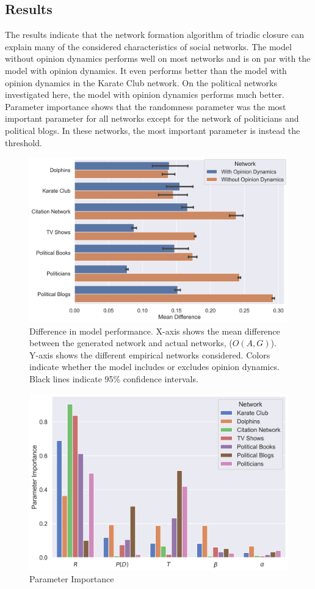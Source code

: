 \documentclass{article}
\begin{document}
\subsection{Results}

The results indicate that the network formation algorithm of triadic closure can explain many of the considered characteristics of social networks. The model without opinion dynamics performs well on most networks and is on par with the model with opinion dynamics. It even performs better than the model with opinion dynamics in the Karate Club network. On the political networks investigated here, the model with opinion dynamics performs much better.
Parameter importance shows that the randomness parameter was the most important parameter for all networks except for the network of politicians and political blogs.  In these networks, the most important parameter is instead the threshold. 

\begin{figure}[H]
    \centering
    \includegraphics[width=.8\linewidth]{../plots/overall/Model_Evaluation.png}
  \caption{Difference in model performance. X-axis shows the mean difference between the generated network and actual networks, ($O(A, G)$). Y-axis shows the different empirical networks considered. Colors indicate whether the model includes or excludes opinion dynamics. Black lines indicate 95\% confidence intervals.}
  \label{fig:sfig1}
\end{figure}

\begin{figure}[H]
    \centering
    \includegraphics[width=.8\linewidth]{../plots/overall/Parameter_Importance.png}
  \caption{Parameter Importance}
  \label{fig:sfig1}
\end{figure}
\end{document}
